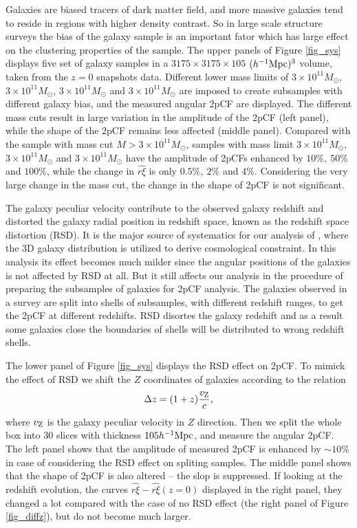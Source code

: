\documentclass[iop]{emulateapj}
\begin{document}
Galaxies are biased tracers of dark matter field, 
and more massive galaxies tend to reside in regions with higher density contrast.
So in large scale structure surveys the bias of the galaxy sample is an important fator which has large effect on the clustering properties of the sample.
The upper panels of Figure \ref{fig_sys} displays five set of galaxy samples in a $3175\times3175\times105$ $(h^{-1}\rm Mpc)^3$ volume, taken from the $z=0$ snapshots data.
Different lower mass limits of $3\times 10^{11} M_{\odot}$, $3\times 10^{11} M_{\odot}$, $3\times 10^{11} M_{\odot}$ and $3\times 10^{11} M_{\odot}$
are imposed to create subsamples with different galaxy bias, 
and the measured angular 2pCF are displayed.
The different mass cuts result in large variation in the amplitude of the 2pCF (left panel),
while the shape of the 2pCF remains less affected (middle panel).
Compared with the sample with mass cut $M>3\times 10^{11} M_{\odot}$,
samples with mass limit $3\times 10^{11} M_{\odot}$, $3\times 10^{11} M_{\odot}$ and $3\times 10^{11} M_{\odot}$
have the amplitude of 2pCFs enhanced by $10\%,\ 50\%$ and $100\%$,
while the change in $\hat{r\xi}$ is only $0.5\%,\ 2\%$ and $4\%$.
Considering the very large change in the mass cut,
the change in the shape of 2pCF is not significant.

The galaxy peculiar velocity contribute to the observed galaxy redshift and distorted the galaxy radial position in redshift space,
known as the redshift space distortion (RSD).
It is the major source of systematics for our analysis of \cite{Li2014,Li2015,Li2016}, where the 3D galaxy distribution is utilized to derive cosmological constraint.
In this analysis its effect becomes much milder since the angular positions of the galaxies is not affected by RSD at all.
But it still affects our analysis in the procedure of preparing the subsamples of galaxies for 2pCF analysis.
The galaxies observed in a survey are split into shells of subsamples, with different redshift ranges, to get the 2pCF at different redshifts.
RSD disortes the galaxy redshift and as a result some galaxies close the boundaries of shells will be distributed to wrong redshift shells.

The lower panel of Figure \ref{fig_sys} displays the RSD effect on 2pCF.
To mimick the effect of RSD we shift the $Z$ coordinates of galaxies according to the relation 
\begin{equation}\label{eq:zvpeu}
\Delta z = (1+z) \frac{v_{{\rm Z}}}{c},
\end{equation}
where $v_{{\rm Z}}$ is the galaxy peculiar velocity in $Z$ direction.
Then we split the whole box into 30 slices with thickness $105h^{-1}\rm Mpc$, 
and measure the angular 2pCF.
The left panel shows that the amplitude of measured 2pCF is enhanced by $\sim 10\%$ in case of considering the RSD effect on spliting samples.
The middle panel shows that the shape of 2pCF is also altered -- the slop is suppressed.
If looking at the redshift evolution,
the curves $\hat{r\xi} - \hat{r\xi}(z=0)$ displayed in the right panel,
they changed a lot compared with the case of no RSD effect (the right panel of Figure \ref{fig_diffz}),
but do not become much larger. %
\end{document}
